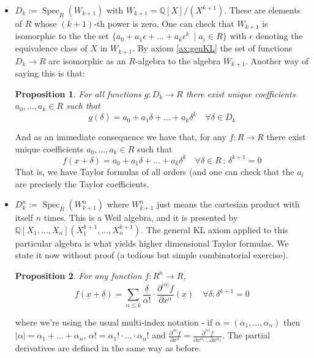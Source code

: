 \documentclass[11pt]{article}
\newtheorem{proposition}{Proposition}[section]
\theoremstyle{definition}
\newcommand{\abs}[1]{\lvert #1 \rvert} %
\renewcommand{\vec}{\underline} %
\DeclareMathOperator{\spec}{Spec}
\numberwithin{equation}{section}
\begin{document}
\begin{itemize}
  \item \( D_k := \spec_R(W_{k+1}) \) with \( W_{k+1} = \mathbb{Q}[X]/(X^{k+1}) \). These are elements of \( R \) whose \( (k+1) \)-th power is zero. One can check that \( W_{k+1} \) is isomorphic to the the set \( \{a_0+a_1\epsilon + \dots + a_k\epsilon^k\ \mid a_i\in R\} \) with \( \epsilon \) denoting the equivalence class of \( X \) in \( W_{k+1} \). By axiom \ref{ax:genKL} the set of functions \( D_k\to R \) are isomorphic as an \( R \)-algebra to the algebra \( W_{k+1} \). Another way of saying this is that:
    \begin{proposition}
      For all functions \( g:D_k\to R \) there exist unique coefficients \( a_0,\dots,a_k\in R \) such that
      \begin{equation*}
	 g(\delta) = a_0 + a_1\delta + \dots + a_k\delta^k \quad \forall\delta\in D_k
      \end{equation*}
    \end{proposition}
    And as an immediate consequence we have that, for any \( f:R\to R \) there exist unique coefficients \( a_0,\dots,a_k\in R \) such that
    \begin{equation*}
      f(x+\delta) = a_0 + a_1\delta + \dots + a_k\delta^k \quad \forall \delta\in R\, :\, \delta^{k+1}=0
    \end{equation*}
    That is, we have Taylor formulas of all orders (and one can check that the \( a_i \) are precisely the Taylor coefficients.

  \item \( D_k^n := \spec_R(W_{k+1}^n) \) where \( W_{k+1}^n \) just means the cartesian product with itself \( n \) times. This is a Weil algebra, and it is presented by \( \mathbb{Q}[X_1,\dots,X_n](X_1^{k+1},\dots,X_n^{k+1}) \). The general KL axiom applied to this particular algebra is what yields higher dimensional Taylor formulae. We state it now without proof (a tedious but simple combinatorial exercise).
    \begin{proposition}
      For any function \( f:R^n\to R \),
      \begin{equation*}
	f( \vec{x} + \vec{\delta} ) = \sum_{\alpha \leq k}{\frac{\vec{\delta}}{\alpha!}\cdot\frac{\partial^{\abs\alpha}f}{\partial x^\alpha}(\vec{x})}\quad \forall \delta : \delta^{k+1}=0
      \end{equation*}
    \end{proposition}
    where we're using the usual multi-index notation - if \( \alpha=(\alpha_1,\dots,\alpha_n) \) then \( \abs\alpha = \alpha_1+\dots+\alpha_n \), \( \alpha! = \alpha_1!\cdot\dots\cdot\alpha_n! \) and \( \frac{\partial^{\abs\alpha}f}{\partial x^\alpha}=\frac{\partial^{\abs\alpha}f}{\partial x^{\alpha_1}\dots\partial x^{\alpha_n}} \). The partial derivatives are defined in the same way as before.

\end{itemize}
\end{document}
